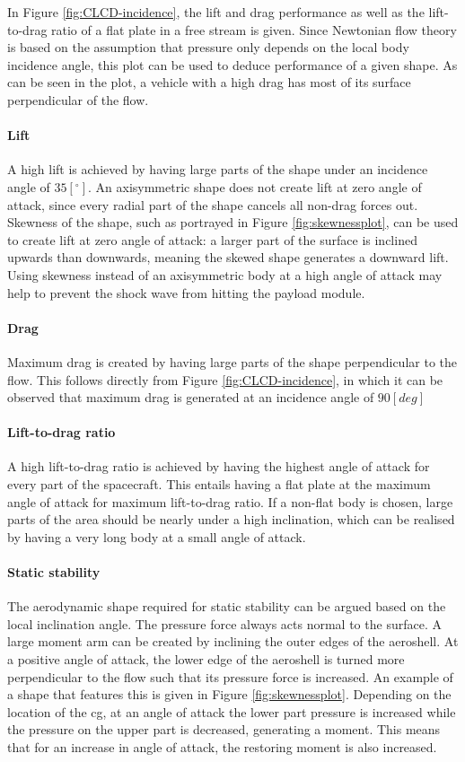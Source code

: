 In Figure \ref{fig:CLCD-incidence}, the lift and drag performance as well as the lift-to-drag ratio of a flat plate in a free stream is given. Since Newtonian flow theory is based on the assumption that pressure only depends on the local body incidence angle, this plot can be used to deduce performance of a given shape. As can be seen in the plot, a vehicle with a high drag has most of its surface perpendicular of the flow.

\paragraph{Lift}
A high lift is achieved by having large parts of the shape under an incidence angle of $35 [^\circ]$. An axisymmetric shape does not create lift at zero angle of attack, since every radial part of the shape cancels all non-drag forces out. Skewness of the shape, such as portrayed in Figure \ref{fig:skewnessplot}, can be used to create lift at zero angle of attack: a larger part of the surface is inclined upwards than downwards, meaning the skewed shape generates a downward lift. Using skewness instead of an axisymmetric body at a high angle of attack may help to prevent the shock wave from hitting the payload module.

\paragraph{Drag}
Maximum drag is created by having large parts of the shape perpendicular to the flow. This follows directly from Figure \ref{fig:CLCD-incidence}, in which it can be observed that maximum drag is generated at an incidence angle of $90 [deg]$

\paragraph{Lift-to-drag ratio}
A high lift-to-drag ratio is achieved by having the highest angle of attack for every part of the spacecraft. This entails having a flat plate at the maximum angle of attack for maximum lift-to-drag ratio. If a non-flat body is chosen, large parts of the area should be nearly under a high inclination, which can be realised by having a very long body at a small angle of attack.

\paragraph{Static stability}
The aerodynamic shape required for static stability can be argued based on the local inclination angle. The pressure force always acts normal to the surface. A large moment arm can be created by inclining the outer edges of the aeroshell. At a positive angle of attack, the lower edge of the aeroshell is turned more perpendicular to the flow such that its pressure force is increased. An example of a shape that features this is given in Figure \ref{fig:skewnessplot}. Depending on the location of the \acrfull{cg}, at an angle of attack the lower part pressure is increased while the pressure on the upper part is decreased, generating a moment. This means that for an increase in angle of attack, the restoring moment is also increased.

